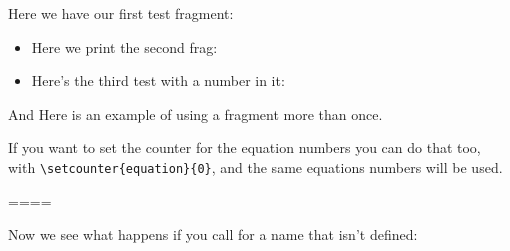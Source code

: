 \documentclass{book}
\begin{document}
\parskip=18pt


Here we have our first test fragment:\\



\begin{itemize}
\item
Here we print the second frag:\\ 


\item
Here's the third test with a number in it:


\end{itemize}

And Here is an example of using a fragment more
than once. 


If you want to set the counter for the equation numbers
you can do that too, with \verb+\setcounter{equation}{0}+,
and the same equations numbers will be used.

\setcounter{equation}{0}


====

Now we see what happens if you call for a name that isn't
defined:

\end{document}
